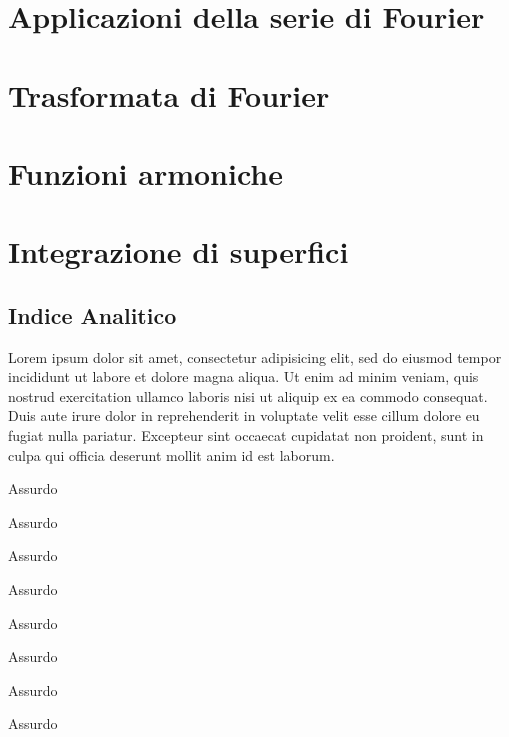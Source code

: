 \documentclass[a4paper, 12pt]{report}
\begin{document}

\chapter{Applicazioni della serie di Fourier}


\chapter{Trasformata di Fourier}


\chapter{Funzioni armoniche}


\chapter{Integrazione di superfici}


\newpage

\section{Indice Analitico}

Lorem ipsum dolor sit amet, consectetur adipisicing elit, sed do eiusmod
tempor incididunt ut labore et dolore magna aliqua. Ut enim ad minim veniam,
quis nostrud exercitation ullamco laboris nisi ut aliquip ex ea commodo
consequat. Duis aute irure dolor in reprehenderit in voluptate velit esse
cillum dolore eu fugiat nulla pariatur. Excepteur sint occaecat cupidatat non
proident, sunt in culpa qui officia deserunt mollit anim id est laborum.

\begin{multicols*}{2}

\makebox[3cm][l]{\absurd} Assurdo

\makebox[3cm][l]{\absurd} Assurdo

\makebox[3cm][l]{\absurd} Assurdo

\makebox[3cm][l]{\absurd} Assurdo

\vfill\null\columnbreak

\makebox[3cm][l]{\absurd} Assurdo

\makebox[3cm][l]{\absurd} Assurdo

\makebox[3cm][l]{\absurd} Assurdo

\makebox[3cm][l]{\absurd} Assurdo

\end{multicols*}
\end{document}
